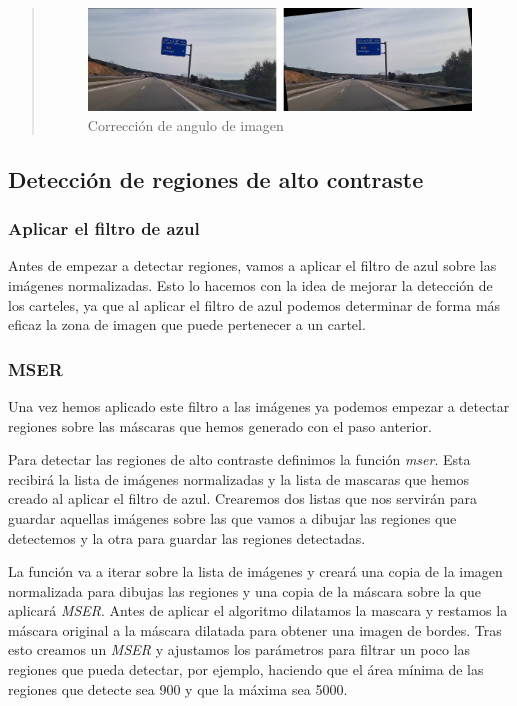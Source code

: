 \documentclass[a4paper, 12pt]{article}
\begin{document}
\begin{quote}
	\begin{figure}[h]
		\centering
		\includegraphics[width=0.7\linewidth]{img/00057_co}
		\caption{Corrección de angulo de imagen}
		\label{fig:00057co}
	\end{figure}
	
\end{quote}

\subsection{Detección de regiones de alto contraste}
\subsubsection{Aplicar el filtro de azul}
Antes de empezar a detectar regiones, vamos a aplicar el filtro de azul sobre las imágenes normalizadas. Esto lo hacemos con la idea de mejorar la detección de los carteles, ya que al aplicar el filtro de azul podemos determinar de forma más eficaz la zona de imagen que puede pertenecer a un cartel. 

\subsubsection{MSER}
Una vez hemos aplicado este filtro a las imágenes ya podemos empezar a detectar regiones sobre las máscaras que hemos generado con el paso anterior.

Para detectar las regiones de alto contraste definimos la función \textit{mser}. Esta recibirá la lista de imágenes normalizadas y la lista de mascaras que hemos creado al aplicar el filtro de azul. 
Crearemos dos listas que nos servirán para guardar aquellas imágenes sobre las que vamos a dibujar las regiones que detectemos y la otra para guardar las regiones detectadas. 


La función va a iterar sobre la lista de imágenes y creará una copia de la imagen normalizada para dibujas las regiones y una copia de la máscara sobre la que aplicará \textit{MSER}. Antes de aplicar el algoritmo dilatamos la mascara y restamos la máscara original a la máscara dilatada para obtener una imagen de bordes. Tras esto creamos un \textit{MSER} y ajustamos los parámetros para filtrar un poco las regiones que pueda detectar, por ejemplo, haciendo que el área mínima de las regiones que detecte sea 900 y que la máxima sea 5000. 
\end{document}
